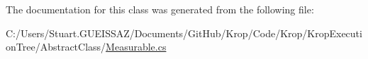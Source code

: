 The documentation for this class was generated from the following file\+:\begin{DoxyCompactItemize}
\item 
C\+:/\+Users/\+Stuart.\+G\+U\+E\+I\+S\+S\+A\+Z/\+Documents/\+Git\+Hub/\+Krop/\+Code/\+Krop/\+Krop\+Execution\+Tree/\+Abstract\+Class/\mbox{\hyperlink{_measurable_8cs}{Measurable.\+cs}}\end{DoxyCompactItemize}
